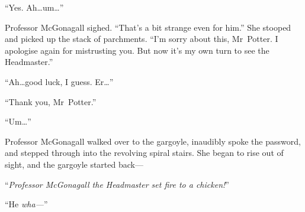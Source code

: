 “Yes. Ah…um…”

Professor McGonagall sighed.
“That’s a bit strange even for him.” She stooped and picked up the stack of parchments.
“I’m sorry about this, Mr~Potter. I apologise again for mistrusting you. But now it’s my own turn to see the Headmaster.”

“Ah…good luck, I guess. Er…”

“Thank you, Mr~Potter.”

“Um…”

Professor McGonagall walked over to the gargoyle, inaudibly spoke the password, and stepped through into the revolving spiral stairs. She began to rise out of sight, and the gargoyle started back—

“\emph{Professor McGonagall the Headmaster set fire to a chicken!}”

“He \emph{wha—}”

